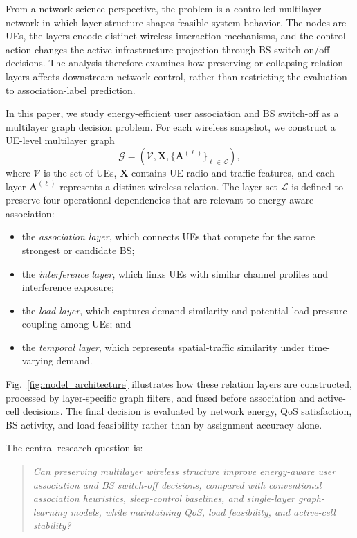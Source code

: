 \documentclass[journal]{IEEEtran}
\begin{document}
From a network-science perspective, the problem is a controlled multilayer
network in which layer structure shapes feasible system behavior. The nodes are
UEs, the layers encode distinct wireless interaction mechanisms, and the
control action changes the active infrastructure projection through BS
switch-on/off decisions. The analysis therefore examines how preserving or
collapsing relation layers affects downstream network control, rather than
restricting the evaluation to association-label prediction.

In this paper, we study energy-efficient user association and BS switch-off as
a multilayer graph decision problem. For each wireless snapshot, we construct a
UE-level multilayer graph
\begin{equation}
    \mathcal{G} = \left(\mathcal{V}, \mathbf{X},
    \{\mathbf{A}^{(\ell)}\}_{\ell \in \mathcal{L}}\right),
\end{equation}
where $\mathcal{V}$ is the set of UEs, $\mathbf{X}$ contains UE radio and
traffic features, and each layer $\mathbf{A}^{(\ell)}$ represents a distinct
wireless relation. The layer set $\mathcal{L}$ is defined to preserve four
operational dependencies that are relevant to energy-aware association:
\begin{itemize}
    \item the \emph{association layer}, which connects UEs that compete for
    the same strongest or candidate BS;
    \item the \emph{interference layer}, which links UEs with similar channel
    profiles and interference exposure;
    \item the \emph{load layer}, which captures demand similarity and
    potential load-pressure coupling among UEs; and
    \item the \emph{temporal layer}, which represents spatial-traffic
    similarity under time-varying demand.
\end{itemize}
Fig.~\ref{fig:model_architecture} illustrates how these relation layers are
constructed, processed by layer-specific graph filters, and fused before
association and active-cell decisions. The final decision is evaluated by
network energy, QoS satisfaction, BS activity, and load feasibility rather than
by assignment accuracy alone.

The central research question is:
\begin{quote}
\emph{Can preserving multilayer wireless structure improve energy-aware user
association and BS switch-off decisions, compared with conventional association
heuristics, sleep-control baselines, and single-layer graph-learning models,
while maintaining QoS, load feasibility, and active-cell stability?}
\end{quote}
\end{document}
